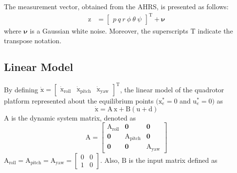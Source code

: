 \documentclass[peerreview]{IEEEtran}
\begin{document}
The measurement vector, obtained from the AHRS, is presented as follows:
\begin{equation}
    \begin{split}
        \boldsymbol{\mathrm{z}} &= \begin{bmatrix}
        p \
        q \
        r \
        \phi \
        \theta \
        \psi
    \end{bmatrix}^\mathrm{T} + \boldsymbol{\nu}
    \end{split}
\end{equation}
where $\boldsymbol{\nu}$ is a Gaussian white noise. Moreover, the superscripts $\mathrm{T}$ indicate the transpose notation.
\subsection{Linear Model}
\noindent By defining $\boldsymbol{\dot{\mathrm{x}}} = \begin{bmatrix}
	\boldsymbol{{\mathrm{\dot x_{\text{roll}}}}}&
	\boldsymbol{{\mathrm{\dot x_{\text{pitch}}}}}&
	\boldsymbol{{\mathrm{\dot x_{\text{yaw}}}}}
\end{bmatrix}^{\mathrm{T}}$, the linear model of the quadrotor platform represented about the equilibrium points $(\boldsymbol{{\mathrm{x}}}_e^*\!=\!0$ and $\boldsymbol{{\mathrm{u}}}_e^*\!=\!0)$ as
\begin{equation}\label{eq:linear}
	\boldsymbol{\dot{\mathrm{x}}} = \boldsymbol{\mathrm{A\,x}} + 
	\boldsymbol{\mathrm{B}}
	\left(\boldsymbol{\mathrm{u}} + \boldsymbol{\mathrm{d}}\right)
\end{equation}
$\boldsymbol{\mathrm{A}}$ is the dynamic system matrix, denoted as
\begin{equation}
	\boldsymbol{\mathrm{A}} = \begin{bmatrix}
		\boldsymbol{{\mathrm{A_{\text{roll}}}}} & \boldsymbol{0} & \boldsymbol{0}\\
		\boldsymbol{0} & \boldsymbol{{\mathrm{A_{\text{pitch}}}}} & \boldsymbol{0} \\
		\boldsymbol{0} & \boldsymbol{0} & \boldsymbol{{\mathrm{A_{\text{yaw}}}}}
	\end{bmatrix}
\end{equation}
$
		\boldsymbol{\mathrm{A}}_{\text{roll}}  =\boldsymbol{\mathrm{A}}_{\text{pitch}}  = \boldsymbol{\mathrm{A}}_{\text{yaw}}  = \begin{bmatrix}
			0 & 0\\
			1 & 0
		\end{bmatrix}
$. Also, $\boldsymbol{\mathrm{B}}$ is the input matrix defined as
\end{document}
